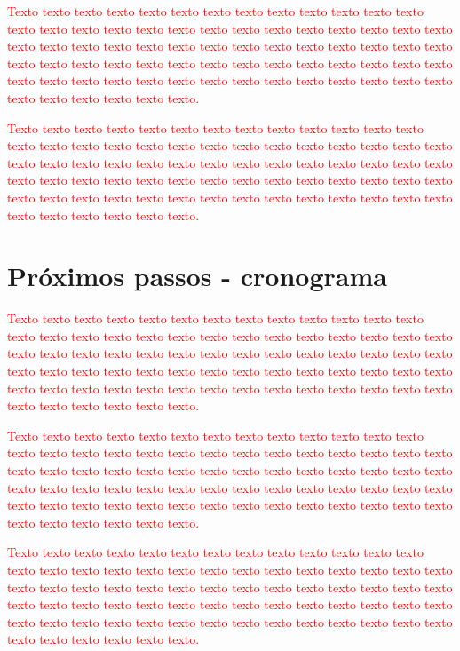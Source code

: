 \documentclass[normaltoc, espacoumemeio, pnumromarab,ruledheader]{abnt}
\begin{document}
\textcolor{red}{Texto texto texto texto texto texto texto texto texto texto texto texto texto texto texto texto texto texto texto texto texto texto texto texto texto texto texto texto texto texto texto texto texto texto texto texto texto texto texto texto texto texto texto texto texto texto texto texto texto texto texto texto texto texto texto texto texto texto texto texto texto texto texto texto texto texto texto texto texto texto texto texto texto texto texto.}

\textcolor{red}{Texto texto texto texto texto texto texto texto texto texto texto texto texto texto texto texto texto texto texto texto texto texto texto texto texto texto texto texto texto texto texto texto texto texto texto texto texto texto texto texto texto texto texto texto texto texto texto texto texto texto texto texto texto texto texto texto texto texto texto texto texto texto texto texto texto texto texto texto texto texto texto texto texto texto texto.}

\section{Próximos passos - cronograma}

\textcolor{red}{Texto texto texto texto texto texto texto texto texto texto texto texto texto texto texto texto texto texto texto texto texto texto texto texto texto texto texto texto texto texto texto texto texto texto texto texto texto texto texto texto texto texto texto texto texto texto texto texto texto texto texto texto texto texto texto texto texto texto texto texto texto texto texto texto texto texto texto texto texto texto texto texto texto texto texto.}

\textcolor{red}{Texto texto texto texto texto texto texto texto texto texto texto texto texto texto texto texto texto texto texto texto texto texto texto texto texto texto texto texto texto texto texto texto texto texto texto texto texto texto texto texto texto texto texto texto texto texto texto texto texto texto texto texto texto texto texto texto texto texto texto texto texto texto texto texto texto texto texto texto texto texto texto texto texto texto texto.}

\textcolor{red}{Texto texto texto texto texto texto texto texto texto texto texto texto texto texto texto texto texto texto texto texto texto texto texto texto texto texto texto texto texto texto texto texto texto texto texto texto texto texto texto texto texto texto texto texto texto texto texto texto texto texto texto texto texto texto texto texto texto texto texto texto texto texto texto texto texto texto texto texto texto texto texto texto texto texto texto.}
	

%


\end{document}

